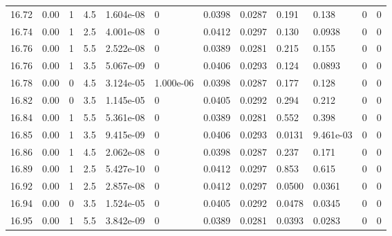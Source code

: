 \documentclass[preview]{standalone}
\begin{document}
{{{{{{{{{{{\begin{tabular}{L{1.2cm}C{1.2cm} C{0.3cm}C{0.5cm} C{1.4cm}C{1.4cm} C{1.4cm}C{1.4cm} C{1.6cm}C{1.6cm} C{1.6cm}C{1.6cm}}
  16.72  &  0.00  & 1     & 4.5 &  1.604e-08  & 0  &  0.0398&   0.0287& 0.191 & 0.138   &  0 & 0  \\ 
  16.74  &  0.00  & 1     & 2.5 &  4.001e-08  & 0  &  0.0412&   0.0297& 0.130 & 0.0938   &  0 & 0  \\ 
  16.76  &  0.00  & 1     & 5.5 &  2.522e-08  & 0  &  0.0389&   0.0281& 0.215 & 0.155   &  0 & 0  \\ 
  16.76  &  0.00  & 1     & 3.5 &  5.067e-09  & 0  &  0.0406&   0.0293& 0.124 & 0.0893   &  0 & 0  \\ 
  16.78  &  0.00  & 0     & 4.5 &  3.124e-05  & 1.000e-06  &  0.0398&   0.0287& 0.177 & 0.128   &  0 & 0  \\ 
  16.82  &  0.00  & 0     & 3.5 &  1.145e-05  & 0  &  0.0405&   0.0292& 0.294 & 0.212   &  0 & 0  \\ 
  16.84  &  0.00  & 1     & 5.5 &  5.361e-08  & 0  &  0.0389&   0.0281& 0.552 & 0.398   &  0 & 0  \\ 
  16.85  &  0.00  & 1     & 3.5 &  9.415e-09  & 0  &  0.0406&   0.0293& 0.0131 & 9.461e-03   &  0 & 0  \\ 
  16.86  &  0.00  & 1     & 4.5 &  2.062e-08  & 0  &  0.0398&   0.0287& 0.237 & 0.171   &  0 & 0  \\ 
  16.89  &  0.00  & 1     & 2.5 &  5.427e-10  & 0  &  0.0412&   0.0297& 0.853 & 0.615   &  0 & 0  \\ 
  16.92  &  0.00  & 1     & 2.5 &  2.857e-08  & 0  &  0.0412&   0.0297& 0.0500 & 0.0361   &  0 & 0  \\ 
  16.94  &  0.00  & 0     & 3.5 &  1.524e-05  & 0  &  0.0405&   0.0292& 0.0478 & 0.0345   &  0 & 0  \\ 
  16.95  &  0.00  & 1     & 5.5 &  3.842e-09  & 0  &  0.0389&   0.0281& 0.0393 & 0.0283   &  0 & 0  \\ 
\hline 
\end{tabular} 

}}}}}}}}}}}
\end{document}
